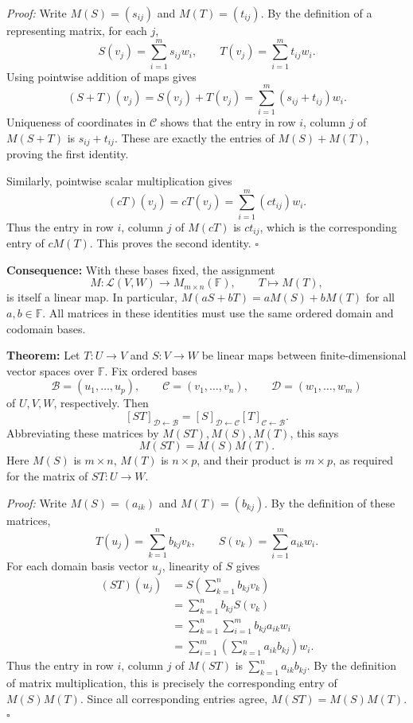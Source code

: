 \documentclass[a4paper,11pt,abstract=true]{scrartcl}
\theoremstyle{dotlessP}
\theoremstyle{dotlessS}
\theoremstyle{remark}
\theoremstyle{definition}
\begin{document}
\begin{claim_box}
\textit{Proof:} Write $M(S)=(s_{ij})$ and $M(T)=(t_{ij})$. By the
definition of a representing matrix, for each $j$,
\[
S(v_j)=\sum_{i=1}^m s_{ij}w_i,
\qquad T(v_j)=\sum_{i=1}^m t_{ij}w_i.
\]
Using pointwise addition of maps gives
\[
(S+T)(v_j)=S(v_j)+T(v_j)
=\sum_{i=1}^m(s_{ij}+t_{ij})w_i.
\]
Uniqueness of coordinates in $\mathcal{C}$ shows that the entry in row
$i$, column $j$ of $M(S+T)$ is $s_{ij}+t_{ij}$. These are exactly the
entries of $M(S)+M(T)$, proving the first identity.

Similarly, pointwise scalar multiplication gives
\[
(cT)(v_j)=cT(v_j)=\sum_{i=1}^m(ct_{ij})w_i.
\]
Thus the entry in row $i$, column $j$ of $M(cT)$ is $ct_{ij}$, which
is the corresponding entry of $cM(T)$. This proves the second identity.
\hfill$\square$
\end{claim_box}

\begin{claim_box}
\textbf{Consequence:} With these bases fixed, the assignment
\[
M:\mathcal{L}(V,W)\longrightarrow M_{m\times n}(\mathbb{F}),
\qquad T\longmapsto M(T),
\]
is itself a linear map. In particular,
$M(aS+bT)=aM(S)+bM(T)$ for all $a,b\in\mathbb{F}$.
All matrices in these identities must use the same ordered domain and
codomain bases.
\end{claim_box}

\begin{problem_box}
\textbf{Theorem:}
Let
$T:U\longrightarrow V$ and $S:V\longrightarrow W$ be linear maps
between finite-dimensional vector spaces over $\mathbb{F}$. Fix ordered
bases
\[
\mathcal{B}=(u_1,\ldots,u_p),\qquad
\mathcal{C}=(v_1,\ldots,v_n),\qquad
\mathcal{D}=(w_1,\ldots,w_m)
\]
of $U,V,W$, respectively. Then
\[
{[ST]}_{\mathcal{D}\leftarrow\mathcal{B}}
={[S]}_{\mathcal{D}\leftarrow\mathcal{C}}
{[T]}_{\mathcal{C}\leftarrow\mathcal{B}}.
\]
Abbreviating these matrices by $M(ST),M(S),M(T)$, this says
\[
M(ST)=M(S)M(T).
\]
Here $M(S)$ is $m\times n$, $M(T)$ is $n\times p$, and their product
is $m\times p$, as required for the matrix of $ST:U\longrightarrow W$.
\end{problem_box}

\begin{claim_box}
\textit{Proof:} Write $M(S)=(a_{ik})$ and $M(T)=(b_{kj})$.
By the definition of these matrices,
\[
T(u_j)=\sum_{k=1}^n b_{kj}v_k,
\qquad S(v_k)=\sum_{i=1}^m a_{ik}w_i.
\]
For each domain basis vector $u_j$, linearity of $S$ gives
\[
\begin{aligned}
(ST)(u_j)
&=S\left(\sum_{k=1}^n b_{kj}v_k\right)\\
&=\sum_{k=1}^n b_{kj}S(v_k)\\
&=\sum_{k=1}^n\sum_{i=1}^m b_{kj}a_{ik}w_i\\
&=\sum_{i=1}^m\left(\sum_{k=1}^n a_{ik}b_{kj}\right)w_i.
\end{aligned}
\]
Thus the entry in row $i$, column $j$ of $M(ST)$ is
$\sum_{k=1}^n a_{ik}b_{kj}$. By the definition of matrix multiplication,
this is precisely the corresponding entry of $M(S)M(T)$.
Since all corresponding entries agree, $M(ST)=M(S)M(T)$.
\hfill$\square$
\end{claim_box}
\end{document}
